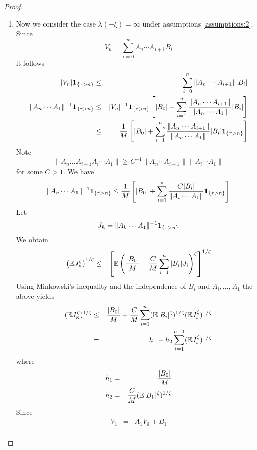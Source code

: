 \documentclass{article}
\theoremstyle{remark}
\begin{document}
\begin{proof}
\begin{enumerate}
  \item Now we consider the case $\lambda(-\xi) = \infty$ under
    assumptions \eqref{assumptions:2}.
    Since
    \[
    V_n = \sum_{i=0}^n A_n \cdots A_{i+1} B_i
    \]
    it follows
    \begin{eqnarray*}
      |V_n|\mathbf{1}_{\{\tau > n\}} &\leq&
      \sum_{i=0}^{n} \|A_n \cdots A_{i+1}\| |B_i| \\
      \|A_n \cdots A_1\|^{-1} \mathbf{1}_{\{\tau > n\}}
      &\leq& |V_n|^{-1} \mathbf{1}_{\{\tau > n\}}
      \left[
        |B_0| + \sum_{i=1}^n {
          \|A_n \cdots A_{i+1}\|
          \over
          \|A_n \cdots A_{1}\|
        } |B_i|
      \right] \\
      &\leq& {1 \over M}
      \left[
        |B_0| + \sum_{i=1}^n {
          \|A_n \cdots A_{i+1}\|
          \over
          \|A_n \cdots A_{1}\|
        } |B_i| \mathbf{1}_{\{\tau > n\}}
      \right]
    \end{eqnarray*}
    Note
    \[
    \|A_n \dots A_{i+1} A_i \cdots A_1\| \geq
    C^{-1} \|A_n \cdots A_{i+1}\|
    \|A_i \cdots A_{1}\|
    \]
    for some $C > 1$. We have
    \[
    \|A_n \cdots A_1\|^{-1} \mathbf{1}_{\{\tau > n\}}
    \leq
    {1 \over M} \left[
      |B_0| + \sum_{i=1}^n {
        C |B_i|
        \over
        \|A_i \cdots A_1\|
      }  \mathbf{1}_{\{\tau > n\}}
    \right]
    \]
    Let
    \[
    J_k = \|A_k \cdots A_1\|^{-1} \mathbf{1}_{\{\tau > n\}}
    \]
    We obtain
    \begin{eqnarray*}
      \left(
        \mathbb{E} J_n^\zeta
      \right)^{1/\zeta} &\leq& \left[
        \mathbb{E} \left(
          {|B_0| \over M}
          + {C \over M} \sum_{i=1}^n |B_i| J_i
        \right)^\zeta
        \right]^{1/\zeta}
    \end{eqnarray*}
    Using Minkowski's inequality and the independence of $B_i$ and
    $A_i, \dots, A_1$ the above yields
    \begin{eqnarray}
      (\mathbb{E} J_n^\zeta)^{1/\zeta} &\leq&
      {|B_0| \over M} + {C \over M}
      \sum_{i=1}^n
      (\mathbb{E} |B_i|^\zeta)^{1/\zeta}
      (\mathbb{E} J_i^\zeta)^{1/\zeta}
      \label{eq:neg_pow_ub} \\
      &=& h_1 + h_2 \sum_{i=1}^{n-1} (\mathbb{E} J_i^\zeta)^{1/\zeta}
      \nonumber
    \end{eqnarray}
    where
    \begin{eqnarray*}
      h_1 &=& {|B_0| \over M} \\
      h_2 &=& {C \over M} (\mathbb{E} |B_1|^\zeta)^{1/\zeta}
    \end{eqnarray*}
    Since
    \begin{eqnarray*}
      V_1 &=& A_1 V_0 + B_1 \\

\end{eqnarray*}
\end{enumerate}
\end{proof}
\end{document}
